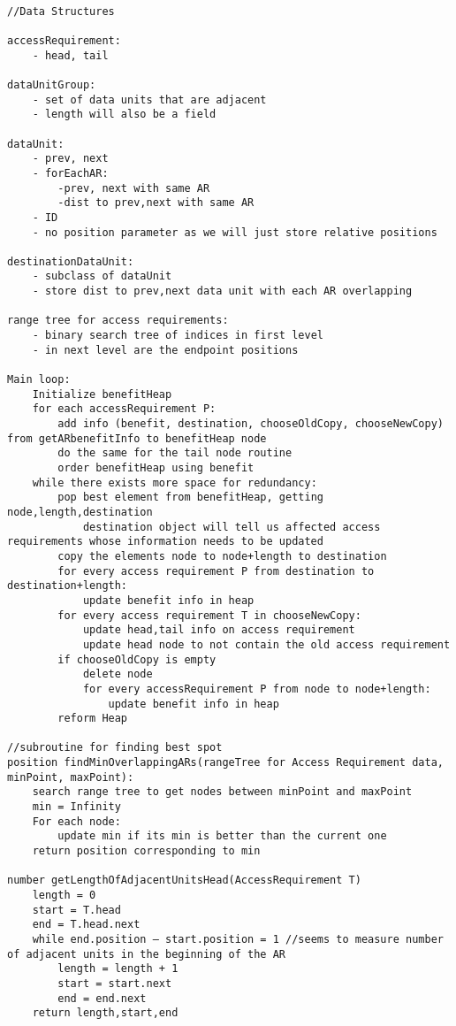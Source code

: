 \documentclass[11pt,psfig]{article}
\begin{document}
\begin{verbatim}

//Data Structures

accessRequirement:
	- head, tail

dataUnitGroup:
	- set of data units that are adjacent
	- length will also be a field

dataUnit:
	- prev, next
	- forEachAR:
		-prev, next with same AR
		-dist to prev,next with same AR
	- ID
	- no position parameter as we will just store relative positions

destinationDataUnit:
	- subclass of dataUnit
	- store dist to prev,next data unit with each AR overlapping

range tree for access requirements:
	- binary search tree of indices in first level
	- in next level are the endpoint positions

Main loop:
	Initialize benefitHeap
	for each accessRequirement P:
		add info (benefit, destination, chooseOldCopy, chooseNewCopy) from getARbenefitInfo to benefitHeap node
		do the same for the tail node routine
		order benefitHeap using benefit
	while there exists more space for redundancy:
		pop best element from benefitHeap, getting node,length,destination
			destination object will tell us affected access requirements whose information needs to be updated
		copy the elements node to node+length to destination
		for every access requirement P from destination to destination+length:
			update benefit info in heap
		for every access requirement T in chooseNewCopy:
			update head,tail info on access requirement
			update head node to not contain the old access requirement
		if chooseOldCopy is empty
			delete node
			for every accessRequirement P from node to node+length:
				update benefit info in heap
		reform Heap

//subroutine for finding best spot
position findMinOverlappingARs(rangeTree for Access Requirement data, minPoint, maxPoint):
	search range tree to get nodes between minPoint and maxPoint
	min = Infinity
	For each node:
		update min if its min is better than the current one
	return position corresponding to min

number getLengthOfAdjacentUnitsHead(AccessRequirement T)
	length = 0
	start = T.head
	end = T.head.next
	while end.position – start.position = 1 //seems to measure number of adjacent units in the beginning of the AR
		length = length + 1
		start = start.next
		end = end.next
	return length,start,end


\end{verbatim}
\end{document}
